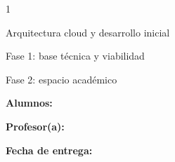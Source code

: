 \begin{titlepage}
\thispagestyle{empty}
\begin{spacing}{1}
\begin{center}
\vspace*{0.5cm}
{\large\bfseries\MakeUppercase{\Institucion}\par}
\vspace{0.25cm}
{\large\MakeUppercase{\Plantel}\par}
\vspace{0.15cm}
{\normalsize\Carrera\par}

\vspace{1.35cm}
{\large\bfseries\MakeUppercase{\Asignatura}\par}

\vspace{1.35cm}
{\LARGE\bfseries\TituloProyecto\par}
\vspace{0.4cm}
{\large Arquitectura cloud y desarrollo inicial\par}
\vspace{0.3cm}
{\normalsize Fase 1: base técnica y viabilidad\par
Fase 2: espacio académico\par}
\end{center}

\vspace{2.2cm}
\begin{flushright}
\begin{minipage}{0.58\textwidth}
\textbf{Alumnos:}\\[0.15cm]
\Integrantes

\vspace{0.5cm}
\textbf{Profesor(a):}\\[0.1cm]
\Profesor

\vspace{0.5cm}
\textbf{Fecha de entrega:}\\[0.1cm]
\FechaEntrega

\vspace{0.5cm}
\LugarEntrega
\end{minipage}
\end{flushright}
\end{spacing}
\end{titlepage}
